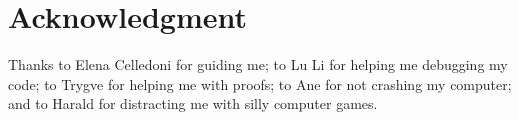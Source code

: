 \section*{Acknowledgment}
Thanks to Elena Celledoni for guiding me; to Lu Li for helping me debugging my code; to Trygve for helping me with proofs; to Ane for not crashing my computer; and to Harald for distracting me with silly computer games. 